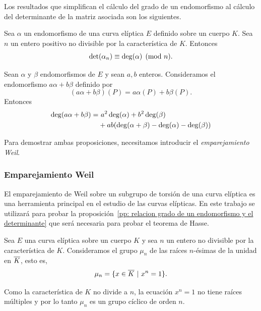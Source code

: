 Los resultados que simplifican el cálculo del grado de un endomorfismo al cálculo del determinante de la matriz asociada son los siguientes.

\begin{proposicion}\label{pp: relacion grado de un endomorfismo y el determinante}
	Sea $\alpha$ un endomorfismo de una curva elíptica $E$ definido sobre un cuerpo $K$. Sea $n$ un entero positivo no divisible por la característica de $K$. Entonces
	$$
		\det(\alpha_n) \equiv \deg(\alpha) \pmod{n}.
	$$
\end{proposicion}

\begin{proposicion}\label{pp:grado endomorfismo a*alpha + b*beta}
	Sean $\alpha$ y $\beta$ endomorfismos de $E$ y sean $a, b$ enteros. Consideramos el endomorfismo $a \alpha + b \beta$ definido por
	$$
		(a \alpha + b \beta)(P) = a \alpha(P) + b \beta(P).
	$$
	Entonces
	\begin{align*}
		\deg(a \alpha + b \beta) =& \ a^2 \deg(\alpha) + b^2 \deg(\beta) \\
		&+ a b (\deg(\alpha + \beta) - \deg(\alpha) - \deg(\beta))
	\end{align*}
\end{proposicion}

Para demostrar ambas proposiciones, necesitamos introducir el \emph{emparejamiento Weil}.

\subsubsection{Emparejamiento Weil}
\label{subs:Emparejamiento Weil}

El emparejamiento de Weil sobre un subgrupo de torsión de una curva elíptica es una herramienta principal en el estudio de las curvas elípticas. En este trabajo se utilizará para probar la proposición~\ref{pp: relacion grado de un endomorfismo y el determinante} que será necesaria para probar el teorema de Hasse.

Sea $E$ una curva elíptica sobre un cuerpo $K$ y sea $n$ un entero no divisible por la característica de $K$. Consideramos el grupo $\mu_n$ de las raíces $n$-ésimas de la unidad en $\overline{K}$, esto es,
$$
	\mu_n = \{ x \in \overline{K} \ | \ x^n = 1 \}.
$$

Como la característica de $K$ no divide a $n$, la ecuación $x^n = 1$ no tiene raíces múltiples y por lo tanto $\mu_n$ es un grupo cíclico de orden $n$.

